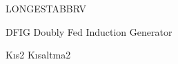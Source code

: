 \begin{theglossary}{LONGESTABBRV}
\item[DFIG] Doubly Fed Induction Generator
\item[Kıs2] Kısaltma2
\end{theglossary}
